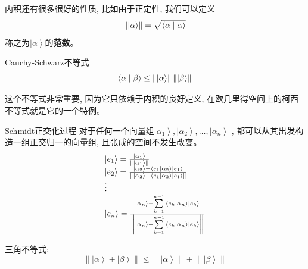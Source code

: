 内积还有很多很好的性质, 比如由于正定性, 我们可以定义\[\left\| {\left| \alpha  \right\rangle } \right\| = \sqrt {\left\langle {\alpha }
\mathrel{\left | {\vphantom {\alpha  \alpha }}\right. \kern-\nulldelimiterspace}{\alpha } \right\rangle } \]
称之为$\left| \alpha  \right\rangle $的\textbf{范数}。
\begin{theorem}{Cauchy-Schwarz不等式}
    \begin{equation}
        \left\langle {\alpha }\mathrel{\left | {\vphantom {\alpha  \beta }}\right. \kern-\nulldelimiterspace}{\beta } \right\rangle \le
        \left\| {\left| \alpha  \right\rangle } \right\|\left\| {\left| \beta  \right\rangle } \right\|
    \end{equation}
\end{theorem}
这个不等式非常重要, 因为它只依赖于内积的良好定义, 在欧几里得空间上的柯西不等式就是它的一个特例。
\begin{proposition}{Schmidt正交化过程}
    对于任何一个向量组${\left| {{\alpha _1}} \right\rangle  ,\left| {{\alpha _2}} \right\rangle  , \ldots,\left| {{\alpha _n}} \right\rangle }$
    , 都可以从其出发构造一组正交归一的向量组, 且张成的空间不发生改变。
    \[\begin{array}{l}
        \left| {{e_1}} \right\rangle  = \frac{{\left| {{\alpha _1}} \right\rangle }}{{\left\| {\left| {{\alpha _1}} \right\rangle } \right\|}}\\
        \left| {{e_2}} \right\rangle  = \frac{{\left| {{\alpha _2}} \right\rangle  - \left\langle {{{e_1}}}
         \mathrel{\left | {\vphantom {{{e_1}} {{\alpha _2}}}}
         \right. \kern-\nulldelimiterspace}
         {{{\alpha _2}}} \right\rangle \left| {{e_1}} \right\rangle }}{{\left\| {\left| {{\alpha _2}} \right\rangle  - \left\langle {{{e_1}}}
         \mathrel{\left | {\vphantom {{{e_1}} {{\alpha _2}}}}
         \right. \kern-\nulldelimiterspace}
         {{{\alpha _2}}} \right\rangle \left| {{e_1}} \right\rangle } \right\|}}\\
         \vdots \\
        \left| {{e_n}} \right\rangle  = \frac{{\left| {{\alpha _n}} \right\rangle  - \sum\limits_{k = 1}^{n - 1} {\left\langle {{{e_k}}}
         \mathrel{\left | {\vphantom {{{e_k}} {{\alpha _n}}}}
         \right. \kern-\nulldelimiterspace}
         {{{\alpha _n}}} \right\rangle \left| {{e_k}} \right\rangle } }}{{\left\| {\left| {{\alpha _n}} \right\rangle  - \sum\limits_{k = 1}^{n - 1} {\left\langle {{{e_k}}}
         \mathrel{\left | {\vphantom {{{e_k}} {{\alpha _n}}}}
         \right. \kern-\nulldelimiterspace}
         {{{\alpha _n}}} \right\rangle \left| {{e_k}} \right\rangle } } \right\|}}
        \end{array}\]
\end{proposition}
三角不等式:
\[\left\| {\left| \alpha  \right\rangle  + \left| \beta  \right\rangle } \right\| \le \left\| {\left| \alpha  \right\rangle } \right\| + \left\| {\left| \beta  \right\rangle } \right\|\]

